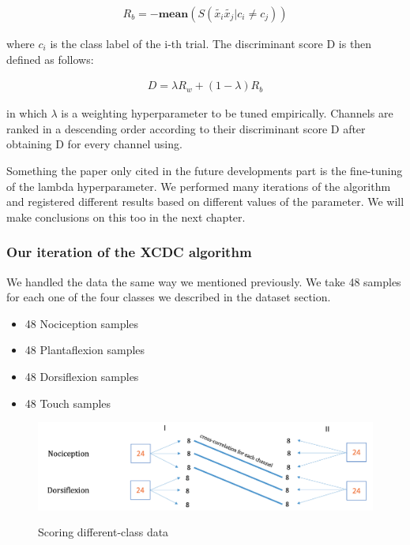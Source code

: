 \documentclass{Configuration_Files/PoliMi3i_thesis}
\begin{document}
\begin{align}
	R_b = -\mathbf{mean}(S(\tilde{x_i}\tilde{x_j}| c_i \neq  c_j))
   \label{eq:XCDC5}
\end{align}

where $c_i$ is the class label of the i-th trial. The discriminant score D is then defined as follows:

\begin{align}
	D = \lambda R_w + (1-\lambda)R_b
   \label{eq:XCDC6}
\end{align}

in which $\lambda$ is a weighting hyperparameter to be tuned empirically.
Channels are ranked in a descending order according to their discriminant score D after obtaining D for every channel using.

Something the paper only cited in the future developments part is the fine-tuning of the lambda hyperparameter.
We performed many iterations of the algorithm and registered different results based on different values of the parameter.
We will make conclusions on this too in the next chapter.

\subsubsection{Our iteration of the XCDC algorithm}

We handled the data the same way we mentioned previously.
We take 48 samples for each one of the four classes we described in the dataset section.

\begin{itemize}
	\item 48 Nociception samples
	\item 48 Plantaflexion samples
	\item 48 Dorsiflexion samples
	\item 48 Touch samples
\end{itemize}

\begin{figure}[H]
    \includegraphics[scale=0.25]{scoreDifferentClass.png}
    \centering
    \label{scoreDifferentClass}
    \caption{Scoring different-class data}
\end{figure}
\end{document}

